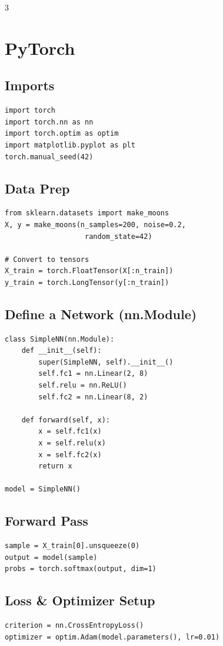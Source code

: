 \documentclass[6pt,landscape,a4paper]{extarticle}
\begin{document}
\begin{multicols}{3}
\section{PyTorch}

\subsection{Imports}
\begin{lstlisting}
import torch
import torch.nn as nn
import torch.optim as optim
import matplotlib.pyplot as plt
torch.manual_seed(42)
\end{lstlisting}

\subsection{Data Prep}
\begin{lstlisting}
from sklearn.datasets import make_moons
X, y = make_moons(n_samples=200, noise=0.2,
                   random_state=42)

# Convert to tensors
X_train = torch.FloatTensor(X[:n_train])
y_train = torch.LongTensor(y[:n_train])
\end{lstlisting}

\subsection{Define a Network (nn.Module)}
\begin{lstlisting}
class SimpleNN(nn.Module):
    def __init__(self):
        super(SimpleNN, self).__init__()
        self.fc1 = nn.Linear(2, 8)
        self.relu = nn.ReLU()
        self.fc2 = nn.Linear(8, 2)

    def forward(self, x):
        x = self.fc1(x)
        x = self.relu(x)
        x = self.fc2(x)
        return x

model = SimpleNN()
\end{lstlisting}

\subsection{Forward Pass}
\begin{lstlisting}
sample = X_train[0].unsqueeze(0)
output = model(sample)
probs = torch.softmax(output, dim=1)
\end{lstlisting}

\subsection{Loss \& Optimizer Setup}
\begin{lstlisting}
criterion = nn.CrossEntropyLoss()
optimizer = optim.Adam(model.parameters(), lr=0.01)
\end{lstlisting}


\end{multicols}
\end{document}
